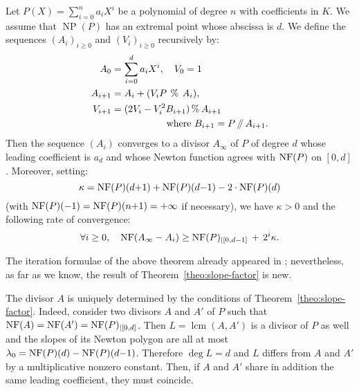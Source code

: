 \documentclass{sig-alternate-05-2015}
\DeclareMathOperator{\NP}{NP}
\DeclareMathOperator{\lcm}{lcm}
\newcommand{\NF}{\text{\rm NF}}
\renewcommand{\mod}{\,\%\,}
\renewcommand{\div}{\,/\hspace{-0.3em}/\,}
\begin{document}
\begin{theo} \label{theo:slope-factor}
Let $P(X) = \sum_{i=0}^n a_i X^i$ be a polynomial of degree $n$ with
coefficients in $K$. We assume that $\NP(P)$ has an extremal point 
whose abscissa is $d$.
We define the sequences $(A_i)_{i \geq 0}$ and $(V_i)_{i \geq 0}$
recursively by:
\begin{align*}
A_0 & = \sum_{i=0}^d a_i X^i, \quad V_{0} = 1 \medskip \\
A_{i+1} &= A_i + (V_i P \:\mod\: A_i), \smallskip \\
V_{i+1} &= (2 V_i -V_i^2 B_{i+1} ) \mod A_{i+1} \\
& \hspace{2cm}\text{where } B_{i+1} = P \div A_{i+1}.
\end{align*}
Then the sequence $(A_i)$ converges to a divisor $A_\infty$ of $P$ 
of degree $d$ whose leading coefficient is $a_d$ and whose Newton 
function agrees with $\NF(P)$ on $[0,d]$.
Moreover, setting:
$$\kappa = \NF(P)(d{+}1) + \NF(P)(d{-}1) - 2 \cdot \NF(P)(d)$$
(with $\NF(P)(-1) = \NF(P)(n{+}1) = +\infty$ if necessary),
we have $\kappa > 0$ and the following rate of convergence:
\begin{equation}
\label{eq:rateconv}
\forall i \geq 0, \quad
\NF(A_\infty - A_i) \geq \NF(P)_{|[0,d{-}1]} \,+\, 2^i \kappa.
\end{equation}
\end{theo}

\begin{rem}
The iteration formulae of the above theorem already appeared 
in \cite[\S~3.1]{berthomieu:hal-00642075}; nevertheless, as far
as we know, the result of Theorem~\ref{theo:slope-factor} is
new.
\end{rem}

\begin{rem}
\label{rem:unicity}
The divisor $A$ is uniquely determined by the conditions of 
Theorem~\ref{theo:slope-factor}. Indeed, consider two divisors
$A$ and $A'$ of $P$ such that $\NF(A) = \NF(A') = \NF(P)_{|[0,d]}$.
Then $L = \lcm(A,A')$ is a divisor of $P$ as well and the 
slopes of its Newton polygon are all at most $\lambda_0 = \NF(P)(d) - 
\NF(P)(d{-}1)$. Therefore $\deg L = d$ and $L$ differs from $A$ and
$A'$ by a multiplicative nonzero constant. Then, if $A$ and $A'$ 
share in addition the same leading coefficient, they must coincide.
\end{rem}
\end{document}
